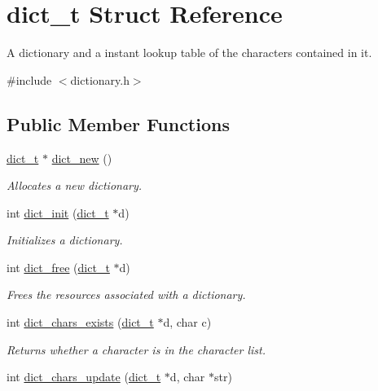 \hypertarget{structdict__t}{}\section{dict\+\_\+t Struct Reference}
\label{structdict__t}


A dictionary and a instant lookup table of the characters contained in it.  




{\ttfamily \#include $<$dictionary.\+h$>$}

\subsection*{Public Member Functions}
\begin{DoxyCompactItemize}
\item 
\mbox{\hyperlink{structdict__t}{dict\+\_\+t}} $\ast$ \mbox{\hyperlink{structdict__t_a0074913fdba65680670bf93153225e2f}{dict\+\_\+new}} ()
\begin{DoxyCompactList}\small\item\em Allocates a new dictionary. \end{DoxyCompactList}\item 
int \mbox{\hyperlink{structdict__t_a81c807e5c6b67b7b482dcac658c0fc57}{dict\+\_\+init}} (\mbox{\hyperlink{structdict__t}{dict\+\_\+t}} $\ast$d)
\begin{DoxyCompactList}\small\item\em Initializes a dictionary. \end{DoxyCompactList}\item 
int \mbox{\hyperlink{structdict__t_a51ee6c067decce8dbc182f95f7b33e91}{dict\+\_\+free}} (\mbox{\hyperlink{structdict__t}{dict\+\_\+t}} $\ast$d)
\begin{DoxyCompactList}\small\item\em Frees the resources associated with a dictionary. \end{DoxyCompactList}\item 
int \mbox{\hyperlink{structdict__t_acc7f38511d6fbf572b62e2aeac7ffddc}{dict\+\_\+chars\+\_\+exists}} (\mbox{\hyperlink{structdict__t}{dict\+\_\+t}} $\ast$d, char c)
\begin{DoxyCompactList}\small\item\em Returns whether a character is in the character list. \end{DoxyCompactList}\item 
int \mbox{\hyperlink{structdict__t_afb48275334e47ae9cab20e1837f0bbcf}{dict\+\_\+chars\+\_\+update}} (\mbox{\hyperlink{structdict__t}{dict\+\_\+t}} $\ast$d, char $\ast$str)

\end{DoxyCompactItemize}
